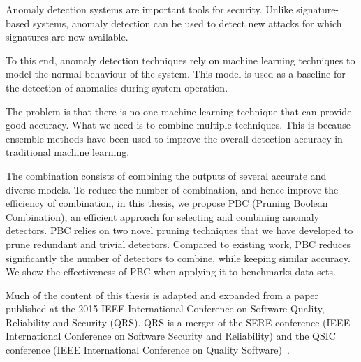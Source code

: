 Anomaly detection systems are important tools for security. Unlike signature-based systems, anomaly detection can be used to detect new attacks for which signatures are now available.

To this end, anomaly detection techniques rely on machine learning techniques to model the normal behaviour of the system. This model is used as a baseline for the detection of anomalies during system operation.

The problem is that there is no one machine learning technique that can provide good accuracy. What we need is to combine multiple techniques. This is because ensemble methods have been used to improve the overall detection accuracy in traditional machine learning. 

The combination consists of combining the outputs of several accurate and diverse models. To reduce the number of combination, and hence improve the efficiency of combination, in this thesis, we propose PBC (Pruning Boolean Combination), an efficient approach for selecting and combining anomaly detectors. PBC relies on two novel pruning techniques that we have developed to  prune redundant and trivial detectors. Compared to existing work, PBC reduces significantly the number of detectors to combine, while keeping similar accuracy. We show the effectiveness of PBC when applying it to benchmarks data sets.

Much of the content of this thesis is adapted and expanded from a paper published at the 2015 IEEE International Conference on Software Quality, Reliability and Security (QRS). QRS is a merger of the SERE conference (IEEE International Conference on Software Security and Reliability) and the QSIC conference (IEEE International Conference on Quality Software)~\cite{Soudi2015}. 
